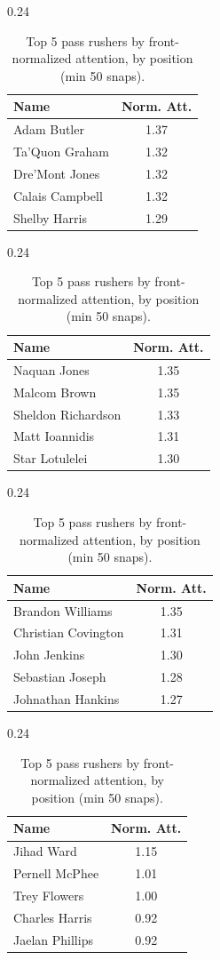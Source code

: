 \begin{table}[h!]
\centering
\begin{subtable}{0.24\textwidth}
\centering
\footnotesize
\begin{tabular}{lc}
\toprule
Name & Norm. Att. \\
\midrule
Adam Butler & 1.37 \\
Ta'Quon Graham & 1.32 \\
Dre'Mont Jones & 1.32 \\
Calais Campbell & 1.32 \\
Shelby Harris & 1.29 \\
\bottomrule
\end{tabular}
\caption{DE}
\end{subtable}
\hfill
\begin{subtable}{0.24\textwidth}
\centering
\footnotesize
\begin{tabular}{lc}
\toprule
Name & Norm. Att. \\
\midrule
Naquan Jones & 1.35 \\
Malcom Brown & 1.35 \\
Sheldon Richardson & 1.33 \\
Matt Ioannidis & 1.31 \\
Star Lotulelei & 1.30 \\
\bottomrule
\end{tabular}
\caption{DT}
\end{subtable}
\hfill
\begin{subtable}{0.24\textwidth}
\centering
\footnotesize
\begin{tabular}{lc}
\toprule
Name & Norm. Att. \\
\midrule
Brandon Williams & 1.35 \\
Christian Covington & 1.31 \\
John Jenkins & 1.30 \\
Sebastian Joseph & 1.28 \\
Johnathan Hankins & 1.27 \\
\bottomrule
\end{tabular}
\caption{NT}
\end{subtable}
\hfill
\begin{subtable}{0.24\textwidth}
\centering
\footnotesize
\begin{tabular}{lc}
\toprule
Name & Norm. Att. \\
\midrule
Jihad Ward & 1.15 \\
Pernell McPhee & 1.01 \\
Trey Flowers & 1.00 \\
Charles Harris & 0.92 \\
Jaelan Phillips & 0.92 \\
\bottomrule
\end{tabular}
\caption{OLB}
\end{subtable}
\caption{Top 5 pass rushers by front-normalized attention, by position (min 50 snaps).}
\label{tab:att_top_norm}
\end{table}

